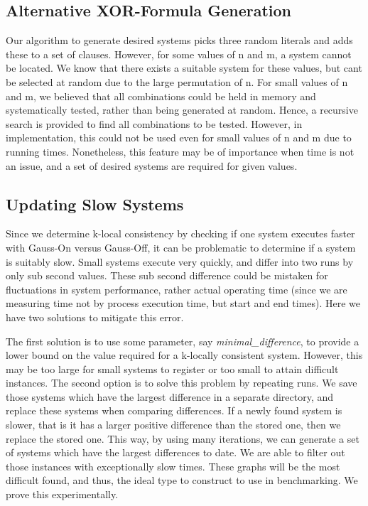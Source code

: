 \subsection{Alternative XOR-Formula Generation}
Our algorithm to generate desired systems picks three random literals and adds these to a set of clauses. However, for some values of n and m, a system cannot be located. We know that there exists a suitable system for these values, but cant be selected at random due to the large permutation of n. For small values of n and m, we believed that all combinations could be held in memory and systematically tested, rather than being generated at random. Hence, a recursive search is provided to find all combinations to be tested. However, in implementation, this could not be used even for small values of n and m due to running times. Nonetheless, this feature may be of importance when time is not an issue, and a set of desired systems are required for given values.

\subsection{Updating Slow Systems}
Since we determine k-local consistency by checking if one system executes faster with Gauss-On versus Gauss-Off, it can be problematic to determine if a system is suitably slow. Small systems execute very quickly, and differ into two runs by only sub second values. These sub second difference could be mistaken for fluctuations in system performance, rather actual operating time (since we are measuring time not by process execution time, but start and end times). Here we have two solutions to mitigate this error.
\par
The first solution is to use some parameter, say \emph{minimal\_difference}, to provide a lower bound on the value required for a k-locally consistent system. However, this may be too large for small systems to register or too small to attain difficult instances. The second option is to solve this problem by repeating runs. We save those systems which have the largest difference in a separate directory, and replace these systems when comparing differences. If a newly found system is slower, that is it has a larger positive difference than the stored one, then we replace the stored one. This way, by using many iterations, we can generate a set of systems which have the largest differences to date. We are able to filter out those instances with exceptionally slow times. These graphs will be the most difficult found, and thus, the ideal type to construct to use in benchmarking. We prove this experimentally.

